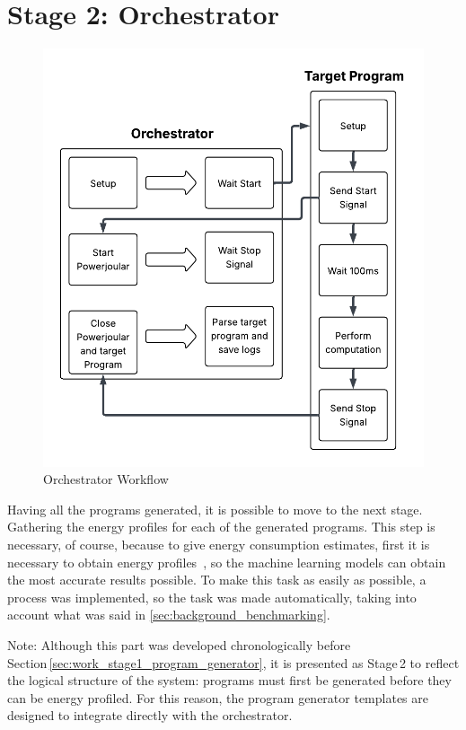 

\section{Stage 2: Orchestrator} \label{sec:work_stage2_orchestrator}

\begin{figure}[htbp]
  \centering
  \includegraphics[scale = 0.7]{figures/orchestrators_process.pdf}
  \caption{Orchestrator Workflow}
  \label{fig:orchestrators_process}
\end{figure}


Having all the programs generated, it is possible to move to the next stage. Gathering the energy profiles for each of the generated programs. This step is necessary, of course, because to give energy consumption estimates, first it is necessary to obtain energy profiles~\cite{10.1145/2884781.2884869,8816747}, so the machine learning models can obtain the most accurate results possible. To make this task as easily as possible, a process was implemented, so the task was made automatically, taking into account what was said in \ref{sec:background_benchmarking}. 

Note: Although this part was developed chronologically before Section \ref{sec:work_stage1_program_generator}, it is presented as Stage 2 to reflect the logical structure of the system: programs must first be generated before they can be energy profiled. For this reason, the program generator templates are designed to integrate directly with the orchestrator.

